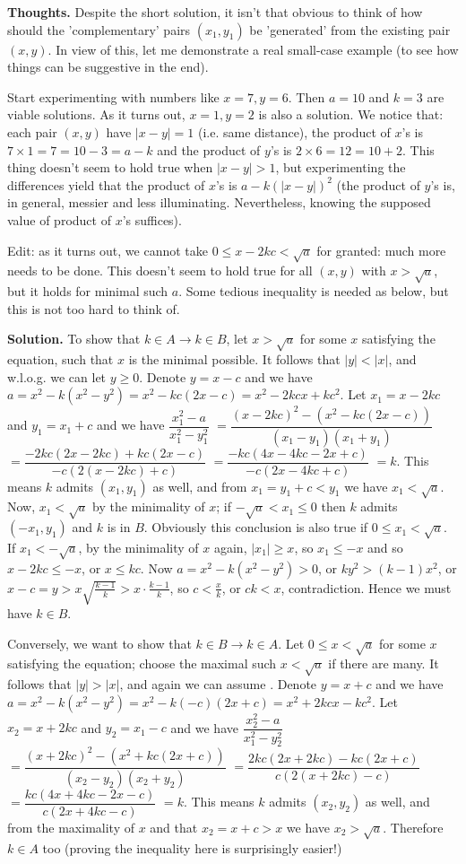 \documentclass[11pt,a4paper]{article}
\begin{document}
\begin{itemize}
\textbf{Thoughts.} Despite the short solution, it isn't that obvious to think of how should the 'complementary' pairs $(x_1, y_1)$ be 'generated' from the existing pair $(x, y)$. In view of this, let me demonstrate a real small-case example (to see how things can be suggestive in the end). 

Start experimenting with numbers like $x=7, y=6$. Then $a=10$ and $k=3$ are viable solutions. As it turns out, $x=1, y=2$ is also a solution. We notice that: each pair $(x, y)$ have $|x-y|=1$ (i.e. same distance), the product of $x$'s is $7\times 1=7=10-3=a-k$ and the product of $y$'s is $2\times 6=12=10+2$. This thing doesn't seem to hold true when $|x-y|>1$, but experimenting the differences yield that the product of $x$'s is $a-k(|x-y|)^2$ (the product of $y$'s is, in general, messier and less illuminating. Nevertheless, knowing the supposed value of product of $x$'s suffices). 

Edit: as it turns out, we cannot take $0\le x-2kc<\sqrt{a}$ for granted: much more needs to be done. This doesn't seem to hold true for all $(x, y)$ with $x>\sqrt{a}$, but it holds for minimal such $a$. Some tedious inequality is needed as below, but this is not too hard to think of. 

\textbf{Solution.} 
To show that $k\in A\to k\in B$, let $x>\sqrt{a}$ for some $x$ satisfying the equation, such that $x$ is the minimal possible. 
It follows that $|y|<|x|$, and w.l.o.g. we can let $y\ge 0$. 
Denote $y=x-c$ and we have $a=x^2-k(x^2-y^2)=x^2-kc(2x-c)=x^2-2kcx+kc^2$. 
Let $x_1=x-2kc$ and $y_1=x_1+c$ and we have 
$\dfrac{x_1^2-a}{x_1^2-y_1^2}$
$=\dfrac{(x-2kc)^2-(x^2-kc(2x-c))}{(x_1-y_1)(x_1+y_1)}$
$=\dfrac{-2kc(2x-2kc)+kc(2x-c)}{-c(2(x-2kc)+c)}$
$=\dfrac{-kc(4x-4kc-2x+c)}{-c(2x-4kc+c)}$
$=k$. 
This means $k$ admits $(x_1, y_1)$ as well, and from $x_1=y_1+c<y_1$ we have $x_1<\sqrt{a}$. 
Now, $x_1<\sqrt{a}$ by the minimality of $x$; if $-\sqrt{a}<x_1\le 0$ then $k$ admits $(-x_1, y_1)$ and $k$ is in $B$. 
Obviously this conclusion is also true if $0\le x_1<\sqrt{a}$. 
If $x_1<-\sqrt{a}$, by the minimality of $x$ again, $|x_1|\ge x$, so $x_1\le -x$ and so $x-2kc\le -x$, or $x\le kc$. 
Now $a=x^2-k(x^2-y^2)>0$, or $ky^2>(k-1)x^2$, or $x-c=y>x\sqrt{\frac{k-1}{k}}>x\cdot \frac{k-1}{k}$, so $c<\frac xk$, or $ck<x$, contradiction. Hence we must have $k\in B$. 

Conversely, we want to show that $k\in B\to k\in A$. 
Let $0\le x<\sqrt{a}$ for some $x$ satisfying the equation; choose the maximal such $x<\sqrt{a}$ if there are many. 
It follows that $|y|>|x|$, and again we can assume . 
Denote $y=x+c$ and we have $a=x^2-k(x^2-y^2)=x^2-k(-c)(2x+c)=x^2+2kcx-kc^2$. 
Let $x_2=x+2kc$ and $y_2=x_1-c$ and we have 
$\dfrac{x_2^2-a}{x_1^2-y_2^2}$
$=\dfrac{(x+2kc)^2-(x^2+kc(2x+c))}{(x_2-y_2)(x_2+y_2)}$
$=\dfrac{2kc(2x+2kc)-kc(2x+c)}{c(2(x+2kc)-c)}$
$=\dfrac{kc(4x+4kc-2x-c)}{c(2x+4kc-c)}$
$=k$. 
This means $k$ admits $(x_2, y_2)$ as well, and from the maximality of $x$ and that $x_2=x+c>x$ we have $x_2>\sqrt{a}$. Therefore
$k\in A$ too (proving the inequality here is surprisingly easier!)


\end{itemize}
\end{document}
